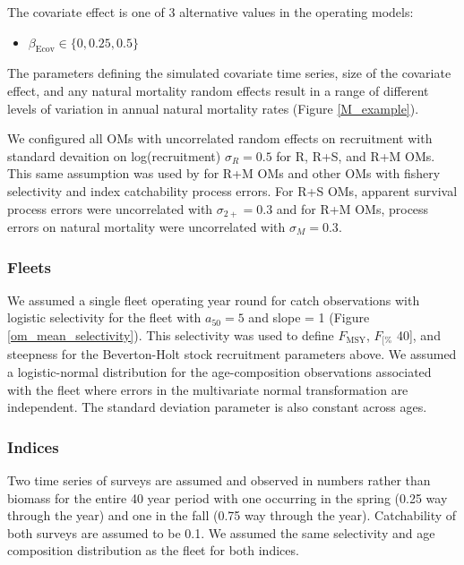 \documentclass[
  12pt,
]{article}
\newcommand{\Fmsy}{\ensuremath{F_{\text{MSY}}}\xspace}
\newcommand{\Fspr}[1]{\ensuremath{F_{\text{{#1}\%}}}\xspace}
\begin{document}
The covariate effect is one of 3 alternative values in the operating models:

\begin{itemize}
\item $\beta_\text{Ecov} \in \{0,0.25,0.5\}$
\end{itemize}

The parameters defining the simulated covariate time series, size of the covariate effect, and any natural mortality random effects result in a range of different levels of variation in annual natural mortality rates (Figure \ref{M_example}).

We configured all OMs with uncorrelated random effects on recruitment with standard devaition on log(recruitment) \(\sigma_R = 0.5\) for R, R+S, and R+M OMs. This same assumption was used by \citet{milleretalinreview} for R+M OMs and other OMs with fishery selectivity and index catchability process errors. For R+S OMs, apparent survival process errors were uncorrelated with \(\sigma_{2+} = 0.3\) and for R+M OMs, process errors on natural mortality were uncorrelated with \(\sigma_M = 0.3\).

\hypertarget{fleets}{%
\subsubsection*{Fleets}\label{fleets}}

We assumed a single fleet operating year round for catch observations with logistic selectivity for the fleet with \(a_{50} = 5\) and slope = 1 (Figure \ref{om_mean_selectivity}). This selectivity was used to define \Fmsy, \Fspr[40], and steepness for the Beverton-Holt stock recruitment parameters above. We assumed a logistic-normal distribution for the age-composition observations associated with the fleet where errors in the multivariate normal transformation are independent. The standard deviation parameter is also constant across ages.

\hypertarget{indices}{%
\subsubsection*{Indices}\label{indices}}

Two time series of surveys are assumed and observed in numbers rather than biomass for the entire 40 year period with one occurring in the spring (0.25 way through the year) and one in the fall (0.75 way through the year). Catchability of both surveys are assumed to be 0.1. We assumed the same selectivity and age composition distribution as the fleet for both indices.
\end{document}
